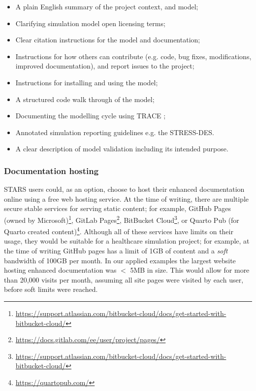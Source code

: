 \documentclass[]{interact}
\theoremstyle{plain}%
\theoremstyle{definition}
\theoremstyle{remark}
\begin{document}
\begin{itemize}
    \item A plain English summary of the project context, and model;
    \item Clarifying simulation model open licensing terms;
    \item Clear citation instructions for the model and documentation;
    \item Instructions for how others can contribute (e.g. code, bug fixes, modifications, improved documentation), and report issues to the project;
    \item Instructions for installing and using the model;
    \item A structured code walk through of the model;
    \item Documenting the modelling cycle using TRACE \citep{TRACE_2021}; 
    \item Annotated simulation reporting guidelines e.g. the STRESS-DES.
    \item A clear description of model validation including its intended purpose.
\end{itemize}


\subsubsection{Documentation hosting}

STARS users could, as an option, choose to host their enhanced documentation online using a free web hosting service. At the time of writing, there are multiple secure stable services  for serving static content; for example, GitHub Pages (owned by Microsoft)\footnote{\url{https://support.atlassian.com/bitbucket-cloud/docs/get-started-with-bitbucket-cloud/}}, GitLab Pages\footnote{\url{https://docs.gitlab.com/ee/user/project/pages/}}, BitBucket Cloud\footnote{\url{https://support.atlassian.com/bitbucket-cloud/docs/get-started-with-bitbucket-cloud/}}, or Quarto Pub (for Quarto created content)\footnote{\url{https://quartopub.com/}}. Although all of these services have limits on their usage, they would be suitable for a healthcare simulation project; for example, at the time of writing GitHub pages has a limit of 1GB of content and a \textit{soft} bandwidth of 100GB per month. In our applied examples the largest website hosting enhanced documentation was $<$ 5MB in size. This would allow for more than 20,000 visits per month, assuming all site pages were visited by each user, before soft limits were reached.  
\end{document}

